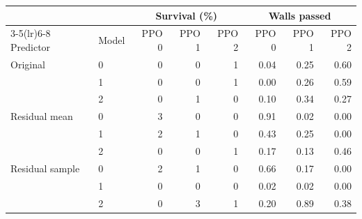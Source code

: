 \begin{tabular}{llrrrrrr}
\toprule
\rowcolor{Navy!8}
 & & \multicolumn{3}{c}{Survival (\%)} & \multicolumn{3}{c}{Walls passed} \\
\cmidrule(lr){3-5}\cmidrule(lr){6-8}
Predictor & Model & PPO 0 & PPO 1 & PPO 2 & PPO 0 & PPO 1 & PPO 2 \\
\midrule
Original & 0 & 0 & 0 & 1 & 0.04 & 0.25 & 0.60 \\
 & 1 & 0 & 0 & 1 & 0.00 & 0.26 & 0.59 \\
 & 2 & 0 & 1 & 0 & 0.10 & 0.34 & 0.27 \\
\midrule
Residual mean & 0 & 3 & 0 & 0 & 0.91 & 0.02 & 0.00 \\
 & 1 & 2 & 1 & 0 & 0.43 & 0.25 & 0.00 \\
 & 2 & 0 & 0 & 1 & 0.17 & 0.13 & 0.46 \\
\midrule
Residual sample & 0 & 2 & 1 & 0 & 0.66 & 0.17 & 0.00 \\
 & 1 & 0 & 0 & 0 & 0.02 & 0.02 & 0.00 \\
 & 2 & 0 & 3 & 1 & 0.20 & 0.89 & 0.38 \\
\bottomrule
\end{tabular}
